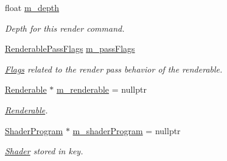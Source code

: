 \begin{DoxyCompactItemize}
\item 
\mbox{\label{classrev_1_1_draw_command_acf9029ba9d104854952de266c6df3b9e}} 
float \mbox{\hyperlink{classrev_1_1_draw_command_acf9029ba9d104854952de266c6df3b9e}{m\+\_\+depth}}
\begin{DoxyCompactList}\small\item\em Depth for this render command. \end{DoxyCompactList}\item 
\mbox{\label{classrev_1_1_draw_command_ad952baf7c701c97267bbafc53a9506be}} 
\mbox{\hyperlink{classrev_1_1_flags}{Renderable\+Pass\+Flags}} \mbox{\hyperlink{classrev_1_1_draw_command_ad952baf7c701c97267bbafc53a9506be}{m\+\_\+pass\+Flags}}
\begin{DoxyCompactList}\small\item\em \mbox{\hyperlink{classrev_1_1_flags}{Flags}} related to the render pass behavior of the renderable. \end{DoxyCompactList}\item 
\mbox{\label{classrev_1_1_draw_command_a687e1798ce0d1606b2a973c26aac0284}} 
\mbox{\hyperlink{classrev_1_1_renderable}{Renderable}} $\ast$ \mbox{\hyperlink{classrev_1_1_draw_command_a687e1798ce0d1606b2a973c26aac0284}{m\+\_\+renderable}} = nullptr
\begin{DoxyCompactList}\small\item\em \mbox{\hyperlink{classrev_1_1_renderable}{Renderable}}. \end{DoxyCompactList}\item 
\mbox{\label{classrev_1_1_draw_command_adf125e896530ac00e1cfe974a2929d69}} 
\mbox{\hyperlink{classrev_1_1_shader_program}{Shader\+Program}} $\ast$ \mbox{\hyperlink{classrev_1_1_draw_command_adf125e896530ac00e1cfe974a2929d69}{m\+\_\+shader\+Program}} = nullptr
\begin{DoxyCompactList}\small\item\em \mbox{\hyperlink{classrev_1_1_shader}{Shader}} stored in key. \end{DoxyCompactList}\item 
\mbox{\label{classrev_1_1_draw_command_a0a0d96462a95f4ddd740f084f16a45bf}} 

\end{DoxyCompactItemize}
